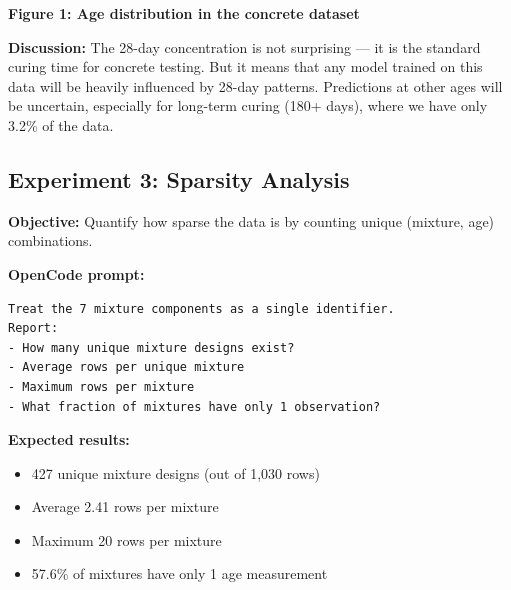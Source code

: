 \documentclass[11pt]{article}
\begin{document}
\begin{center}
\end{center}
\begin{center}
\textbf{Figure 1: Age distribution in the concrete dataset}
\end{center}

\textbf{Discussion:}
The 28-day concentration is not surprising --- it is the standard curing time for concrete testing.  But it means that any model trained on this data will be heavily influenced by 28-day patterns.  Predictions at other ages will be uncertain, especially for long-term curing (180+ days), where we have only 3.2\% of the data.

\subsection{Experiment 3: Sparsity Analysis}
\label{sec:experiment-3}

\textbf{Objective:} Quantify how sparse the data is by counting unique (mixture, age) combinations.

\textbf{OpenCode prompt:}
\begin{lstlisting}[style=term]
Treat the 7 mixture components as a single identifier.
Report:
- How many unique mixture designs exist?
- Average rows per unique mixture
- Maximum rows per mixture
- What fraction of mixtures have only 1 observation?
\end{lstlisting}

\textbf{Expected results:}
\begin{itemize}[nosep]
  \item 427 unique mixture designs (out of 1,030 rows)
  \item Average 2.41 rows per mixture
  \item Maximum 20 rows per mixture
  \item 57.6\% of mixtures have only 1 age measurement
\end{itemize}
\end{document}
